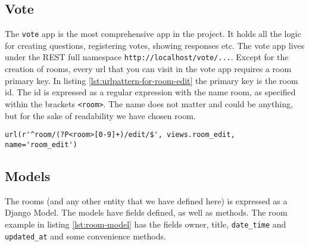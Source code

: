 
\subsection{Vote}
The \texttt{vote} app is the most comprehensive app in the project. It holds all the logic for creating questions, registering votes, showing responses etc. The vote app lives under the REST full namespace \texttt{http://localhost/vote/...}. Except for the creation of rooms, every url that you can visit in the vote app requires a room primary key. In listing \ref{lst:urlpattern-for-room-edit} the primary key is the room id. The id is expressed as a regular expression with the name room, as specified within the brackets \texttt{<room>}. The name does not matter and could be anything, but for the sake of readability we have chosen room.

\begin{lstlisting}[caption=URL Pattern for Room Edit, label=lst:urlpattern-for-room-edit]
url(r'^room/(?P<room>[0-9]+)/edit/$', views.room_edit, name='room_edit')
\end{lstlisting}

\subsection{Models}
The rooms (and any other entity that we have defined here) is expressed as a Django Model.  
The models have fields defined, as well as methods. The room example in listing \ref{lst:room-model} has the fields owner, title, \texttt{date\_time} and \texttt{updated\_at} and some convenience methods.

